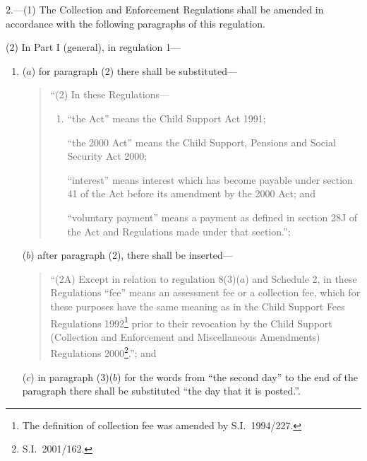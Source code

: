 \documentclass[12pt,a4paper]{article}
\begin{document}
2.---(1)  The Collection and Enforcement Regulations shall be amended in accordance with the following paragraphs of this regulation.

(2) In Part I (general), in regulation 1—
\begin{enumerate}\item[]
($a$) for paragraph (2) there shall be substituted—
\begin{quotation}
“(2) In these Regulations—
\begin{enumerate}\item[]
“the Act” means the Child Support Act 1991;

“the 2000 Act” means the Child Support, Pensions and Social Security Act 2000;

“interest” means interest which has become payable under section 41 of the Act before its amendment by the 2000 Act; and

“voluntary payment” means a payment as defined in section 28J of the Act and Regulations made under that section.”;
\end{enumerate}
\end{quotation}

($b$) after paragraph (2), there shall be inserted—
\begin{quotation}
“(2A) Except in relation to regulation 8(3)($a$)  and Schedule 2, in these Regulations “fee” means an assessment fee or a collection fee, which for these purposes have the same meaning as in the Child Support Fees Regulations 1992\footnote{The definition of collection fee was amended by S.I.\ 1994/227.} prior to their revocation by the Child Support (Collection and Enforcement and Miscellaneous Amendments) Regulations 2000\footnote{S.I.\ 2001/162.}.”; and
\end{quotation}

($c$) in paragraph (3)($b$)  for the words from “the second day” to the end of the paragraph there shall be substituted “the day that it is posted.”.
\end{enumerate}
\end{document}
